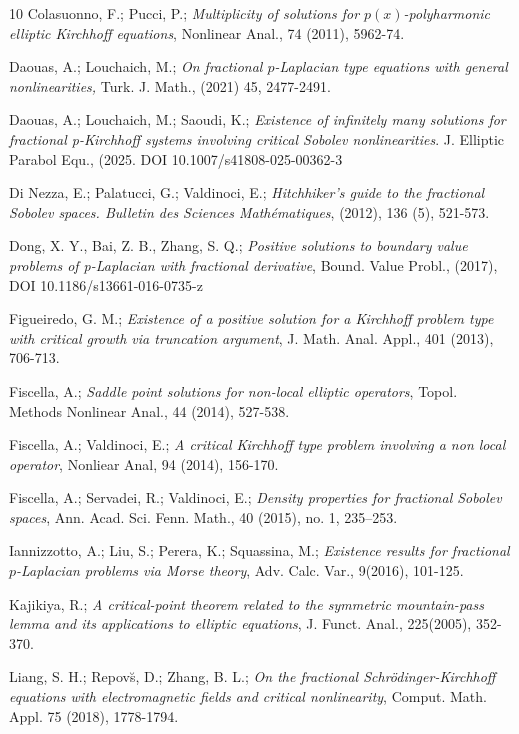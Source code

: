 \documentclass[reqno]{amsart}
\begin{document}
\begin{thebibliography}{10}
 Colasuonno, F.; Pucci, P.;
\emph{Multiplicity of solutions for $p(x)$-polyharmonic elliptic Kirchhoff equations}, 
Nonlinear Anal.,  74 (2011), 5962-74.

 Daouas, A.; Louchaich, M.;
\emph{On fractional $p$-Laplacian type equations with general nonlinearities,} 
Turk. J. Math., (2021) 45, 2477-2491.

 Daouas, A.; Louchaich, M.; Saoudi, K.;
\emph{Existence of infinitely many solutions for fractional p-Kirchhoff systems 
involving critical Sobolev nonlinearities}. J. Elliptic Parabol Equ.,
 (2025. DOI 10.1007/s41808-025-00362-3

 Di Nezza, E.; Palatucci, G.; Valdinoci, E.;
\emph{Hitchhiker's guide to the fractional Sobolev spaces. Bulletin des Sciences 
Math\'ematiques}, (2012), 136 (5), 521-573.

 Dong, X. Y., Bai, Z. B., Zhang, S. Q.;
\emph{Positive solutions to boundary value problems of p-Laplacian with fractional 
derivative}, Bound. Value Probl., (2017),  DOI 10.1186/s13661-016-0735-z

  Figueiredo, G. M.;
\emph{Existence of a positive solution for a Kirchhoff problem type with critical 
growth via truncation argument}, J. Math. Anal. Appl., 401 (2013), 706-713.

 Fiscella, A.;
\emph{Saddle  point  solutions  for  non-local  elliptic  operators},  
Topol. Methods Nonlinear Anal., 44 (2014), 527-538.

  Fiscella, A.;  Valdinoci, E.;
\emph{A critical Kirchhoff type problem involving a non local operator}, 
Nonliear Anal, 94 (2014), 156-170.

 Fiscella, A.; Servadei, R.; Valdinoci, E.;
\emph{Density properties for fractional Sobolev spaces}, 
Ann. Acad. Sci. Fenn. Math., 40 (2015), no. 1, 235–253.

 Iannizzotto, A.; Liu, S.; Perera, K.; Squassina, M.;
\emph{Existence results for fractional $p$-Laplacian problems via Morse theory}, 
Adv. Calc. Var., 9(2016), 101-125.

 Kajikiya, R.;
\emph{A critical-point theorem related to the symmetric mountain-pass lemma and its
 applications to elliptic equations}, J. Funct. Anal., 225(2005), 352-370.

 Liang, S. H.; Repov\u s, D.; Zhang, B. L.;
\emph{On the fractional Schr\"odinger-Kirchhoff equations with electromagnetic 
fields and critical nonlinearity}, Comput. Math. Appl. 75 (2018), 1778-1794.


\end{thebibliography}
\end{document}
